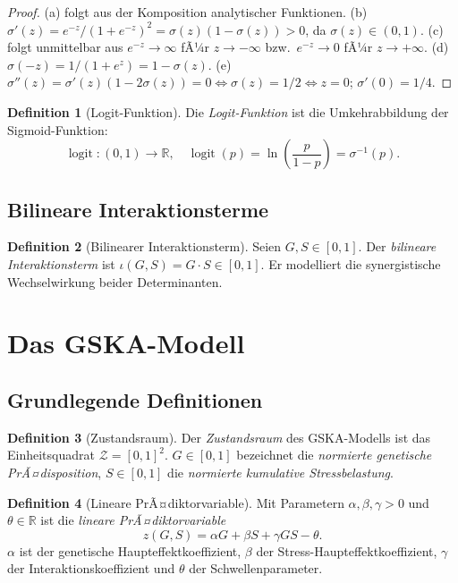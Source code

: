 ﻿\documentclass[12pt, a4paper]{article}
\theoremstyle{definition}
\newtheorem{definition}{Definition}[section]
\theoremstyle{remark}
\DeclareMathOperator{\logit}{logit}
\newcommand{\R}{\mathbb{R}}
\begin{document}
\begin{proof}
(a) folgt aus der Komposition analytischer Funktionen.
(b) $\sigma'(z) = e^{-z}/(1+e^{-z})^2 = \sigma(z)(1-\sigma(z)) > 0$, da
$\sigma(z) \in (0,1)$.
(c) folgt unmittelbar aus $e^{-z} \to \infty$ fÃ¼r $z \to -\infty$ bzw.\
$e^{-z} \to 0$ fÃ¼r $z \to +\infty$.
(d) $\sigma(-z) = 1/(1+e^z) = 1 - \sigma(z)$.
(e) $\sigma''(z) = \sigma'(z)(1-2\sigma(z)) = 0 \iff \sigma(z)=1/2 \iff z=0$;
$\sigma'(0) = 1/4$.
\end{proof}

\begin{definition}[Logit-Funktion]
\label{def:logit}
Die \emph{Logit-Funktion} ist die Umkehrabbildung der Sigmoid-Funktion:
\[
  \logit : (0,1) \to \R, \quad \logit(p) = \ln\!\left(\frac{p}{1-p}\right) = \sigma^{-1}(p).
\]
\end{definition}

\subsection{Bilineare Interaktionsterme}

\begin{definition}[Bilinearer Interaktionsterm]
\label{def:bilinear}
Seien $G, S \in [0,1]$. Der \emph{bilineare Interaktionsterm} ist
$\iota(G,S) = G \cdot S \in [0,1]$.
Er modelliert die synergistische Wechselwirkung beider Determinanten.
\end{definition}


\section{Das GSKA-Modell}
\label{sec:modell}


\subsection{Grundlegende Definitionen}

\begin{definition}[Zustandsraum]
\label{def:zustandsraum}
Der \emph{Zustandsraum} des GSKA-Modells ist das Einheitsquadrat
$\mathcal{Z} = [0,1]^2$.
$G \in [0,1]$ bezeichnet die \emph{normierte genetische PrÃ¤disposition},
$S \in [0,1]$ die \emph{normierte kumulative Stressbelastung}.
\end{definition}

\begin{definition}[Lineare PrÃ¤diktorvariable]
\label{def:praediktor}
Mit Parametern $\alpha, \beta, \gamma > 0$ und $\theta \in \R$ ist die
\emph{lineare PrÃ¤diktorvariable}
\[
  z(G,S) = \alpha G + \beta S + \gamma G S - \theta.
\]
$\alpha$ ist der genetische Haupteffektkoeffizient, $\beta$ der
Stress-Haupteffektkoeffizient, $\gamma$ der Interaktionskoeffizient
und $\theta$ der Schwellenparameter.
\end{definition}
\end{document}
